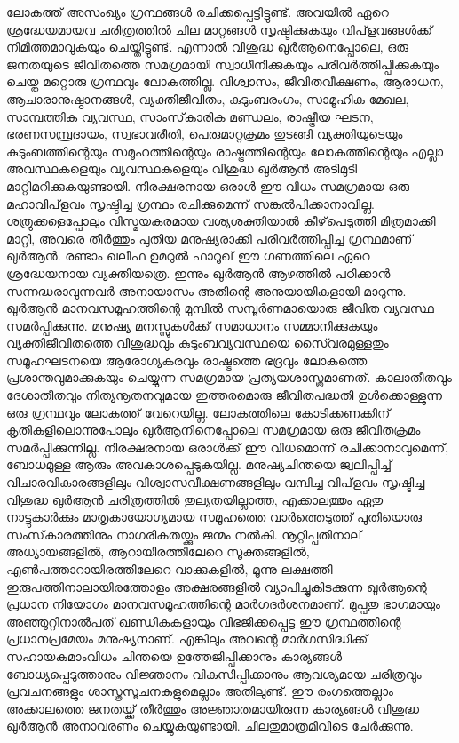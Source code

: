 ലോകത്ത് അസംഖ്യം ഗ്രന്ഥങ്ങള്‍ രചിക്കപ്പെട്ടിട്ടുണ്ട്. അവയില്‍ ഏറെ ശ്രദ്ധേയമായവ ചരിത്രത്തില്‍ ചില മാറ്റങ്ങള്‍ സൃഷ്ടിക്കുകയും വിപ്‌ളവങ്ങള്‍ക്ക് നിമിത്തമാവുകയും ചെയ്തിട്ടുണ്ട്. എന്നാല്‍ വിശുദ്ധ ഖുര്‍ആനെപ്പോലെ, ഒരു ജനതയുടെ ജീവിതത്തെ സമഗ്രമായി സ്വാധീനിക്കുകയും പരിവര്‍ത്തിപ്പിക്കുകയും ചെയ്ത മറ്റൊരു ഗ്രന്ഥവും ലോകത്തില്ല. വിശ്വാസം, ജീവിതവീക്ഷണം, ആരാധന, ആചാരാനുഷ്ഠാനങ്ങള്‍, വ്യക്തിജീവിതം, കുടുംബരംഗം, സാമൂഹിക മേഖല, സാമ്പത്തിക വ്യവസ്ഥ, സാംസ്‌കാരിക മണ്ഡലം, രാഷ്ട്രീയ ഘടന, ഭരണസമ്പ്രദായം, സ്വഭാവരീതി, പെരുമാറ്റക്രമം തുടങ്ങി വ്യക്തിയുടെയും കുടുംബത്തിന്റെയും സമൂഹത്തിന്റെയും രാഷ്ട്രത്തിന്റെയും ലോകത്തിന്റെയും എല്ലാ അവസ്ഥകളെയും വ്യവസ്ഥകളെയും വിശുദ്ധ ഖുര്‍ആന്‍ അടിമുടി മാറ്റിമറിക്കുകയുണ്ടായി. നിരക്ഷരനായ ഒരാള്‍ ഈ വിധം സമഗ്രമായ ഒരു മഹാവിപ്‌ളവം സൃഷ്ടിച്ച ഗ്രന്ഥം രചിക്കുമെന്ന് സങ്കല്‍പിക്കാനാവില്ല. ശത്രുക്കളെപ്പോലും വിസ്മയകരമായ വശ്യശക്തിയാല്‍ കീഴ്‌പെടുത്തി മിത്രമാക്കി മാറ്റി, അവരെ തീര്‍ത്തും പുതിയ മനുഷ്യരാക്കി പരിവര്‍ത്തിപ്പിച്ച ഗ്രന്ഥമാണ് ഖുര്‍ആന്‍. രണ്ടാം ഖലീഫ ഉമറുല്‍ ഫാറൂഖ് ഈ ഗണത്തിലെ ഏറെ ശ്രദ്ധേയനായ വ്യക്തിയത്രെ. ഇന്നും ഖുര്‍ആന്‍ ആഴത്തില്‍ പഠിക്കാന്‍ സന്നദ്ധരാവുന്നവര്‍ അനായാസം അതിന്റെ അനുയായികളായി മാറുന്നു.
ഖുര്‍ആന്‍ മാനവസമൂഹത്തിന്റെ മുമ്പില്‍ സമ്പൂര്‍ണമായൊരു ജീവിത വ്യവസ്ഥ സമര്‍പ്പിക്കുന്നു. മനുഷ്യ മനസ്സുകള്‍ക്ക് സമാധാനം സമ്മാനിക്കുകയും വ്യക്തിജീവിതത്തെ വിശുദ്ധവും കുടുംബവ്യവസ്ഥയെ സൈ്വരമുള്ളതും സമൂഹഘടനയെ ആരോഗ്യകരവും രാഷ്ട്രത്തെ ഭദ്രവും ലോകത്തെ പ്രശാന്തവുമാക്കുകയും ചെയ്യുന്ന സമഗ്രമായ പ്രത്യയശാസ്ത്രമാണത്. കാലാതീതവും ദേശാതീതവും നിത്യനൂതനവുമായ ഇത്തരമൊരു ജീവിതപദ്ധതി ഉള്‍ക്കൊള്ളുന്ന ഒരു ഗ്രന്ഥവും ലോകത്ത് വേറെയില്ല. ലോകത്തിലെ കോടിക്കണക്കിന് കൃതികളിലൊന്നുപോലും ഖുര്‍ആനിനെപ്പോലെ സമഗ്രമായ ഒരു ജീവിതക്രമം സമര്‍പ്പിക്കുന്നില്ല. നിരക്ഷരനായ ഒരാള്‍ക്ക് ഈ വിധമൊന്ന് രചിക്കാനാവുമെന്ന്, ബോധമുള്ള ആരും അവകാശപ്പെടുകയില്ല.
മനുഷ്യചിന്തയെ ജ്വലിപ്പിച്ച് വിചാരവികാരങ്ങളിലും വിശ്വാസവീക്ഷണങ്ങളിലും വമ്പിച്ച വിപ്‌ളവം സൃഷ്ടിച്ച വിശുദ്ധ ഖുര്‍ആന്‍ ചരിത്രത്തില്‍ തുല്യതയില്ലാത്ത, എക്കാലത്തും ഏതു നാട്ടുകാര്‍ക്കും മാതൃകായോഗ്യമായ സമൂഹത്തെ വാര്‍ത്തെടുത്ത് പുതിയൊരു സംസ്‌കാരത്തിനും നാഗരികതയ്ക്കും ജന്മം നല്‍കി. നൂറ്റിപ്പതിനാല് അധ്യായങ്ങളില്‍, ആറായിരത്തിലേറെ സൂക്തങ്ങളില്‍, എണ്‍പത്താറായിരത്തിലേറെ വാക്കുകളില്‍, മൂന്നു ലക്ഷത്തി ഇരുപത്തിനാലായിരത്തോളം അക്ഷരങ്ങളില്‍ വ്യാപിച്ചുകിടക്കുന്ന ഖുര്‍ആന്റെ പ്രധാന നിയോഗം മാനവസമൂഹത്തിന്റെ മാര്‍ഗദര്‍ശനമാണ്. മുപ്പതു ഭാഗമായും അഞ്ഞൂറ്റിനാല്‍പത് ഖണ്ഡികകളായും വിഭജിക്കപ്പെട്ട ഈ ഗ്രന്ഥത്തിന്റെ പ്രധാനപ്രമേയം മനുഷ്യനാണ്. എങ്കിലും അവന്റെ മാര്‍ഗസിദ്ധിക്ക് സഹായകമാംവിധം ചിന്തയെ ഉത്തേജിപ്പിക്കാനും കാര്യങ്ങള്‍ ബോധ്യപ്പെടുത്താനും വിജ്ഞാനം വികസിപ്പിക്കാനും ആവശ്യമായ ചരിത്രവും പ്രവചനങ്ങളും ശാസ്ത്രസൂചനകളുമെല്ലാം അതിലുണ്ട്. ഈ രംഗത്തെല്ലാം അക്കാലത്തെ ജനതയ്ക്ക് തീര്‍ത്തും അജ്ഞാതമായിരുന്ന കാര്യങ്ങള്‍ വിശുദ്ധ ഖുര്‍ആന്‍ അനാവരണം ചെയ്യുകയുണ്ടായി. ചിലതുമാത്രമിവിടെ ചേര്‍ക്കുന്നു.
